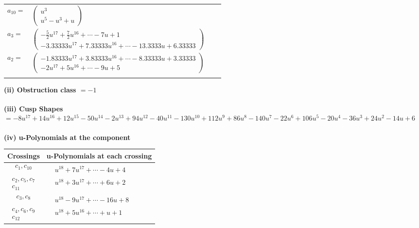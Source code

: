 \documentclass[1p]{elsarticle_modified}
\theoremstyle{definition}
\begin{document}
\begin{tabular}{m{7pt} m{180pt} m{7pt} m{180pt} }
\flushright $a_{10}=$&$\begin{pmatrix}u^3\\u^5- u^3+u\end{pmatrix}$ \\
\flushright $a_{3}=$&$\begin{pmatrix}-\frac{5}{2} u^{17}+\frac{7}{2} u^{16}+\cdots-7 u+1\\-3.33333 u^{17}+7.33333 u^{16}+\cdots-13.3333 u+6.33333\end{pmatrix}$ \\
\flushright $a_{2}=$&$\begin{pmatrix}-1.83333 u^{17}+3.83333 u^{16}+\cdots-8.33333 u+3.33333\\-2 u^{17}+5 u^{16}+\cdots-9 u+5\end{pmatrix}$\\&\end{tabular}
\flushleft \textbf{(ii) Obstruction class $= -1$}\\~\\
\flushleft \textbf{(iii) Cusp Shapes $= -8 u^{17}+14 u^{16}+12 u^{15}-50 u^{14}-2 u^{13}+94 u^{12}-40 u^{11}-130 u^{10}+112 u^9+86 u^8-140 u^7-22 u^6+106 u^5-20 u^4-36 u^3+24 u^2-14 u+6$}\\~\\
\newpage\renewcommand{\arraystretch}{1}
\flushleft \textbf{(iv) u-Polynomials at the component}\newline \\
\begin{tabular}{m{50pt}|m{274pt}}
Crossings & \hspace{64pt}u-Polynomials at each crossing \\
\hline $$\begin{aligned}c_{1},c_{10}\end{aligned}$$&$\begin{aligned}
&u^{18}+7 u^{17}+\cdots-4 u+4
\end{aligned}$\\
\hline $$\begin{aligned}c_{2},c_{5},c_{7}\\c_{11}\end{aligned}$$&$\begin{aligned}
&u^{18}+3 u^{17}+\cdots+6 u+2
\end{aligned}$\\
\hline $$\begin{aligned}c_{3},c_{8}\end{aligned}$$&$\begin{aligned}
&u^{18}-9 u^{17}+\cdots-16 u+8
\end{aligned}$\\
\hline $$\begin{aligned}c_{4},c_{6},c_{9}\\c_{12}\end{aligned}$$&$\begin{aligned}
&u^{18}+5 u^{16}+\cdots+u+1
\end{aligned}$\\
\hline
\end{tabular}\\~\\
\end{document}
